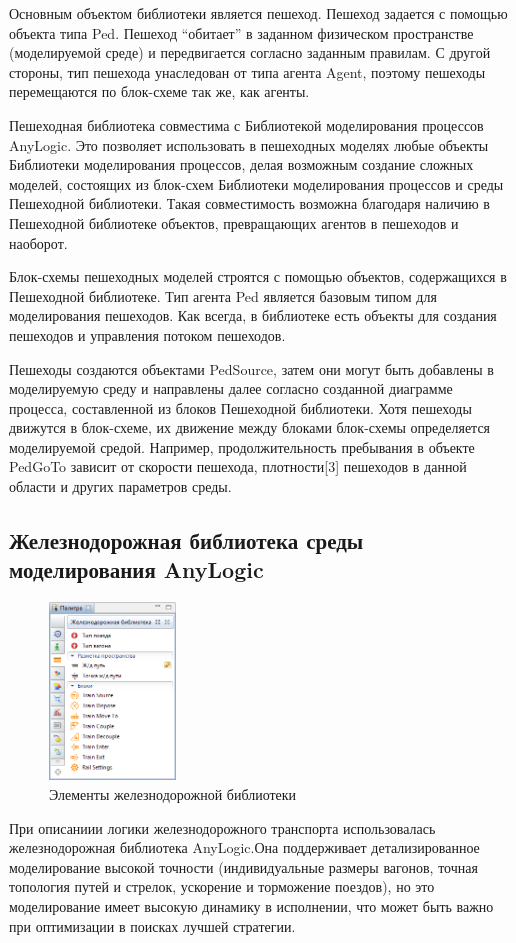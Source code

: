 \documentclass[12pt]{article}
\begin{document}
 Основным объектом библиотеки является пешеход. Пешеход задается с помощью объекта типа Ped. Пешеход “обитает” в заданном физическом пространстве (моделируемой среде) и передвигается согласно заданным правилам. С другой стороны, тип пешехода унаследован от типа агента Agent, поэтому пешеходы перемещаются по блок-схеме так же, как агенты. 

 Пешеходная библиотека совместима с Библиотекой моделирования процессов AnyLogic. Это позволяет использовать в пешеходных моделях любые объекты Библиотеки моделирования процессов, делая возможным создание сложных моделей, состоящих из блок-схем Библиотеки моделирования процессов и среды Пешеходной библиотеки. Такая совместимость возможна благодаря наличию в Пешеходной библиотеке объектов, превращающих агентов в пешеходов и наоборот. 

 Блок-схемы пешеходных моделей строятся с помощью объектов, содержащихся в Пешеходной библиотеке. Тип агента Ped является базовым типом для моделирования пешеходов. Как всегда, в библиотеке есть объекты для создания пешеходов и управления потоком пешеходов. 

Пешеходы создаются объектами PedSource, затем они могут быть добавлены в моделируемую среду и направлены далее согласно созданной диаграмме процесса, составленной из блоков Пешеходной библиотеки. Хотя пешеходы движутся в блок-схеме, их движение между блоками блок-схемы определяется моделируемой средой. Например, продолжительность пребывания в объекте PedGoTo зависит от скорости пешехода, плотности[3] пешеходов в данной области и других параметров среды.

\newpage
		\subsection {Железнодорожная библиотека среды моделирования AnyLogic }
			\hspace{\parindent}
			
 \begin{figure}
  	\begin{center}
  	  	\includegraphics[width=0.3\textwidth]{rail_lib.png}
 	 \end{center}
	  	\caption{Элементы железнодорожной библиотеки}
\end{figure}
При описаниии логики железнодорожного транспорта использовалась железнодорожная библиотека AnyLogic.Она  поддерживает детализированное моделирование высокой точности (индивидуальные размеры вагонов, точная топология путей и стрелок, ускорение и торможение поездов), но это моделирование имеет высокую динамику в исполнении, что может быть важно при оптимизации в поисках лучшей стратегии.
\end{document}

